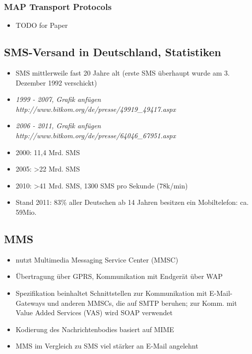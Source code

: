 \documentclass[german,12pt,a4paper]{article}
\begin{document}
\subsubsection{MAP Transport Protocols}
\begin{itemize}
	\item TODO for Paper
\end{itemize}

\subsection{SMS-Versand in Deutschland, Statistiken}
\begin{itemize}
	\item SMS mittlerweile fast 20 Jahre alt (erste SMS überhaupt wurde am 3. Dezember 1992 verschickt)
	\item \textit{1999 - 2007, Grafik anfügen http://www.bitkom.org/de/presse/49919\_49417.aspx}
	\item \textit{2006 - 2011, Grafik anfügen http://www.bitkom.org/de/presse/64046\_67951.aspx}
	\item 2000: 11,4 Mrd. SMS
	\item 2005: \textgreater 22 Mrd. SMS
	\item 2010: \textgreater 41 Mrd. SMS, 1300 SMS pro Sekunde (78k/min)
	\item Stand 2011: 83\% aller Deutschen ab 14 Jahren besitzen ein Mobiltelefon: ca. 59Mio.
\end{itemize}

\subsection{MMS}
\begin{itemize}
	\item nutzt Multimedia Messaging Service Center (MMSC)
	\item Übertragung über GPRS, Kommunikation mit Endgerät über WAP
	\item Spezifikation beinhaltet Schnittstellen zur Kommunikation mit E-Mail-Gateways und anderen MMSCs, die auf 
		SMTP beruhen; zur Komm. mit Value Added Services (VAS) wird SOAP verwendet
	\item Kodierung des Nachrichtenbodies basiert auf MIME
	\item MMS im Vergleich zu SMS viel stärker an E-Mail angelehnt
\end{itemize}
\end{document}
